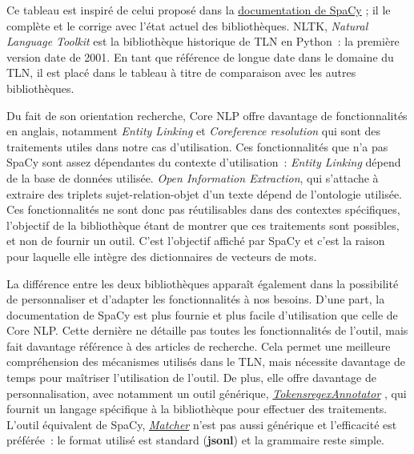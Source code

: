 Ce tableau est inspiré de celui proposé dans la \href{https://spacy.io/usage/facts-figures}{documentation de SpaCy} \cite{spacy-figures}; il le complète et le corrige avec l'état actuel des bibliothèques. NLTK, \textit{Natural Language Toolkit} est la bibliothèque historique de TLN en Python~: la première version date de 2001. En tant que référence de longue date dans le domaine du TLN, il est placé dans le tableau à titre de comparaison avec les autres bibliothèques.
\newline

Du fait de son orientation recherche, Core NLP offre davantage de fonctionnalités en anglais, notamment \textit{Entity Linking} et \textit{Coreference resolution} qui sont des traitements utiles dans notre cas d'utilisation. Ces fonctionnalités que n'a pas SpaCy sont assez dépendantes du contexte d'utilisation~: \textit{Entity Linking} dépend de la base de données utilisée. \textit{Open Information Extraction}, qui s'attache à extraire des triplets sujet-relation-objet d'un texte dépend de l'ontologie utilisée. Ces fonctionnalités ne sont donc pas réutilisables dans des contextes spécifiques, l'objectif de la bibliothèque étant de montrer que ces traitements sont possibles, et non de fournir un outil. C'est l'objectif affiché par SpaCy et c'est la raison pour laquelle elle intègre des dictionnaires de vecteurs de mots.
\newline

La différence entre les deux bibliothèques apparaît également dans la possibilité de personnaliser et d'adapter les fonctionnalités à nos besoins. D'une part, la documentation de SpaCy est plus fournie et plus facile d'utilisation que celle de Core NLP. Cette dernière ne détaille pas toutes les fonctionnalités de l'outil, mais fait davantage référence à des articles de recherche. Cela permet une meilleure compréhension des mécanismes utilisés dans le TLN, mais nécessite davantage de temps pour maîtriser l'utilisation de l'outil. De plus, elle offre  davantage de personnalisation, avec notamment un outil générique, \href{https://stanfordnlp.github.io/CoreNLP/tokensregex.html}{\textit{TokensregexAnnotator}} \cite{corenlp-tokensreg}, qui fournit un langage spécifique à la bibliothèque pour effectuer des traitements. L'outil équivalent de SpaCy, \href{https://spacy.io/usage/rule-based-matching}{\textit{Matcher}} \cite{spacy-ruler} n'est pas aussi générique et l'efficacité est préférée~: le format utilisé est standard (\textbf{jsonl}) et la grammaire reste simple.
\newline

